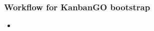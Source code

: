 \begin{frame}
\frametitle{Workflow for KanbanGO bootstrap}

\begin{itemize}
\item 
\end{itemize}

\end{frame}